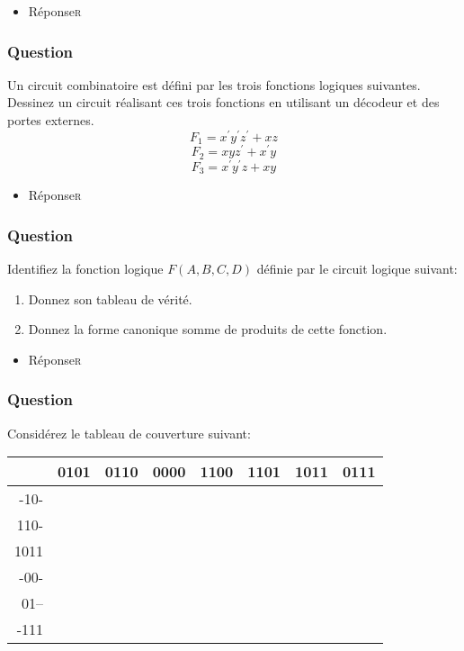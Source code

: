 \documentclass[11pt]{article}
\begin{document}
\begin{itemize}
\item Réponse\hfill{}\textsc{r}
\label{sec:orgba1ecfa}
\end{itemize}

\subsubsection*{Question}
\label{sec:org82d4d5e}
Un circuit combinatoire est défini par les trois fonctions logiques
  suivantes. Dessinez un circuit réalisant ces trois fonctions en
  utilisant un décodeur et des portes externes.
  $$
    F_1  = x^{\prime} y^{\prime} z^{\prime} + xz 
    $$
  $$
    F_2  = x y z^{\prime} + x^{\prime} y 
    $$
  $$
    F_3  = x^{\prime} y^{\prime} z + x y
    $$

\begin{itemize}
\item Réponse\hfill{}\textsc{r}
\label{sec:org32ceb42}
\end{itemize}

\subsubsection*{Question}
\label{sec:org7f3386e}
 Identifiez la fonction logique \(F(A,B,C,D)\) définie par le circuit
   logique suivant:
\begin{center}

\end{center}
\begin{enumerate}
\item Donnez son tableau de vérité.

\item Donnez la forme canonique somme de produits de cette fonction.
\end{enumerate}

\begin{itemize}
\item Réponse\hfill{}\textsc{r}
\label{sec:org56dd9a7}
\end{itemize}

\subsubsection*{Question}
\label{sec:orgd4ecd47}
Considérez le tableau de couverture suivant:

\begin{center}
\begin{tabular}{rrrrrrrr}
 & 0101 & 0110 & 0000 & 1100 & 1101 & 1011 & 0111\\
\hline
-10- &  &  &  &  &  &  & \\
110- &  &  &  &  &  &  & \\
1011 &  &  &  &  &  &  & \\
-00- &  &  &  &  &  &  & \\
01-- &  &  &  &  &  &  & \\
-111 &  &  &  &  &  &  & \\
\end{tabular}
\end{center}
\end{document}
